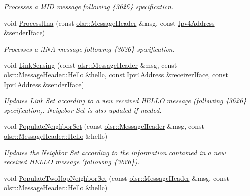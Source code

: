 \begin{DoxyCompactItemize}
\begin{DoxyCompactList}\small\item\em Processes a M\+ID message following \{3626\} specification. \end{DoxyCompactList}\item 
void \hyperlink{classns3_1_1olsr_1_1RoutingProtocol_ab384b31d2faae5b64952052a7eb4eed2}{Process\+Hna} (const \hyperlink{classns3_1_1olsr_1_1MessageHeader}{olsr\+::\+Message\+Header} \&msg, const \hyperlink{classns3_1_1Ipv4Address}{Ipv4\+Address} \&sender\+Iface)
\begin{DoxyCompactList}\small\item\em Processes a H\+NA message following \{3626\} specification. \end{DoxyCompactList}\item 
void \hyperlink{classns3_1_1olsr_1_1RoutingProtocol_a2a23a0fd6fa714fef6613afd3f5bc1d2}{Link\+Sensing} (const \hyperlink{classns3_1_1olsr_1_1MessageHeader}{olsr\+::\+Message\+Header} \&msg, const \hyperlink{structns3_1_1olsr_1_1MessageHeader_1_1Hello}{olsr\+::\+Message\+Header\+::\+Hello} \&hello, const \hyperlink{classns3_1_1Ipv4Address}{Ipv4\+Address} \&receiver\+Iface, const \hyperlink{classns3_1_1Ipv4Address}{Ipv4\+Address} \&sender\+Iface)
\begin{DoxyCompactList}\small\item\em Updates Link Set according to a new received H\+E\+L\+LO message (following \{3626\} specification). Neighbor Set is also updated if needed. \end{DoxyCompactList}\item 
void \hyperlink{classns3_1_1olsr_1_1RoutingProtocol_a9a9cccf9682782a0b95539862b4e6b53}{Populate\+Neighbor\+Set} (const \hyperlink{classns3_1_1olsr_1_1MessageHeader}{olsr\+::\+Message\+Header} \&msg, const \hyperlink{structns3_1_1olsr_1_1MessageHeader_1_1Hello}{olsr\+::\+Message\+Header\+::\+Hello} \&hello)
\begin{DoxyCompactList}\small\item\em Updates the Neighbor Set according to the information contained in a new received H\+E\+L\+LO message (following \{3626\}). \end{DoxyCompactList}\item 
void \hyperlink{classns3_1_1olsr_1_1RoutingProtocol_a4a8eb48c32cebfa630bb7168882faa26}{Populate\+Two\+Hop\+Neighbor\+Set} (const \hyperlink{classns3_1_1olsr_1_1MessageHeader}{olsr\+::\+Message\+Header} \&msg, const \hyperlink{structns3_1_1olsr_1_1MessageHeader_1_1Hello}{olsr\+::\+Message\+Header\+::\+Hello} \&hello)

\end{DoxyCompactItemize}
